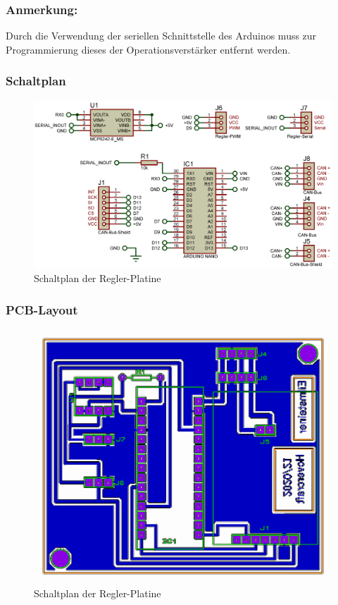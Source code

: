 \subsubsection{Anmerkung:}
Durch die Verwendung der seriellen Schnittstelle des Arduinos muss zur Programmierung dieses der Operationsverstärker entfernt werden.
\newpage

\subsubsection{Schaltplan}
\begin{figure}[h]
    \centering
    \includegraphics[width=1.0\textwidth]{../Proteus/Exports/Regler-Platine.png}    
    \caption{Schaltplan der Regler-Platine}
\end{figure}

\newpage

\subsubsection{PCB-Layout}
\begin{figure}[h]
    \centering
    \includegraphics[width=1.0\textwidth]{../Proteus/Exports/Regler_Platine_PCB.png}    
    \caption{Schaltplan der Regler-Platine}
\end{figure}

